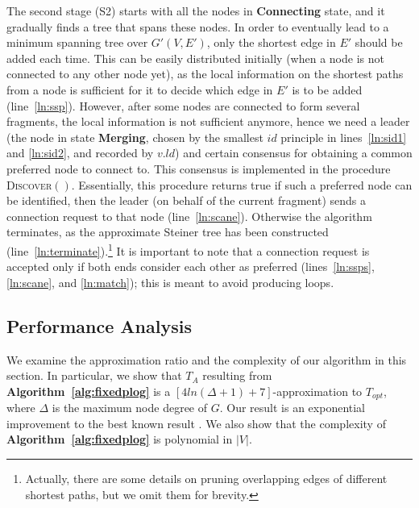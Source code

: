 \documentclass[10pt, conference, compsocconf]{IEEEtran}
\begin{document}
    The second stage (S2) starts with all the nodes in \textbf{Connecting} state, and it gradually finds a tree that spans these nodes. In order to eventually lead to a minimum spanning tree over $G'(V, E')$, only the shortest edge in $E'$ should be added each time. This can be easily distributed initially (when a node is not connected to any other node yet), as the local information on the shortest paths from a node is sufficient for it to decide which edge in $E'$ is to be added (line~\ref{ln:ssp}). However, after some nodes are connected to form several fragments, the local information is not sufficient anymore, hence we need a leader (the node in state \textbf{Merging}, chosen by the smallest $\mathit{id}$ principle in lines~\ref{ln:sid1} and \ref{ln:sid2}, and recorded by $v.\mathit{ld}$) and certain consensus for obtaining a common preferred node to connect to. This consensus is implemented in the procedure \textsc{Discover}$()$. Essentially, this procedure returns true if such a preferred node can be identified, then the leader (on behalf of the current fragment) sends a connection request to that node (line~\ref{ln:scane}). Otherwise the algorithm terminates, as the approximate Steiner tree has been constructed (line~\ref{ln:terminate}).\footnote{Actually, there are some details on pruning overlapping edges of different shortest paths, but we omit them for brevity.} It is important to note that a connection request is accepted only if both ends consider each other as preferred (lines~\ref{ln:ssps}, \ref{ln:scane}, and \ref{ln:match}); this is meant to avoid producing loops.

  \subsection{Performance Analysis} \label{sec:perf1}
We examine the approximation ratio and the complexity of our algorithm in this section. In particular, we show that $T_A$ resulting from \textbf{Algorithm~\ref{alg:fixedplog}} is a $\left[4ln(\Delta+1)+7\right]$-approximation to $T_\mathit{opt}$, where $\Delta$ is the maximum node degree of $G$. Our result is an exponential improvement to the best known result \cite{Liang2009}. We also show that the complexity of \textbf{Algorithm~\ref{alg:fixedplog}} is polynomial in $|V|$.
\end{document}
